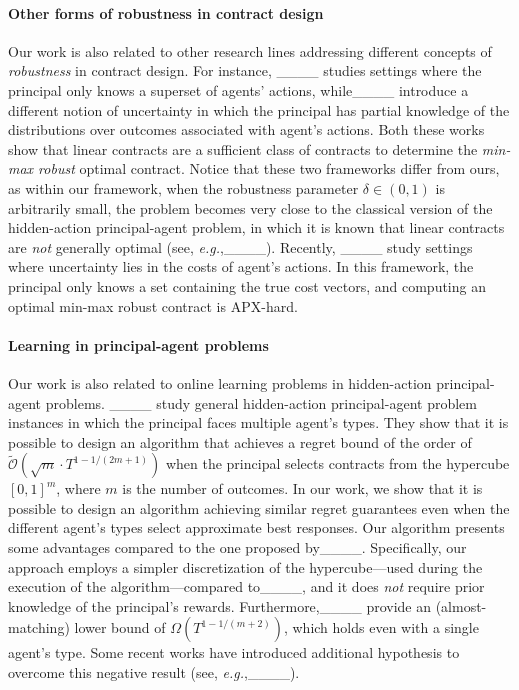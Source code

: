 \paragraph{Other forms of robustness in contract design} 
%
Our work is also related to other research lines addressing different concepts of \emph{robustness} in contract design.
%
%
For instance, ____ studies settings where the principal only knows a superset of agents' actions, while____ introduce a different notion of uncertainty in which the principal has partial knowledge of the distributions over outcomes associated with agent's actions.
%
Both these works show that linear contracts are a sufficient class of contracts to determine the \emph{min-max robust} optimal contract.
%
Notice that these two frameworks differ from ours, as within our framework, when the robustness parameter $\delta \in (0,1)$ is arbitrarily small, the problem becomes very close to the classical version of the hidden-action principal-agent problem, in which it is known that linear contracts are \emph{not} generally optimal (see, \emph{e.g.},____).
%
Recently, ____ study settings where uncertainty lies in the costs of agent's actions.
%
In this framework, the principal only knows a set containing the true cost vectors, and computing an optimal min-max robust contract is \textnormal{APX}-hard.
%
\paragraph{Learning in principal-agent problems} 
%
Our work is also related to online learning problems in hidden-action principal-agent problems.
%
____ study general hidden-action principal-agent problem instances in which the principal faces multiple agent's types.
%
They show that it is possible to design an algorithm that achieves a regret bound of the order of $ \widetilde{\mathcal{O}}(\sqrt{m} \cdot T^{1 - 1/(2m+1)})$ when the principal selects contracts from the hypercube $[0,1]^m$, where $m$ is the number of outcomes.
%
In our work, we show that it is possible to design an algorithm achieving similar regret guarantees even when the different agent's types select approximate best responses.
%
Our algorithm presents some advantages compared to the one proposed by____. 
%
Specifically, our approach employs a simpler discretization of the hypercube---used during the execution of the algorithm---compared to____, and it does \emph{not} require prior knowledge of the principal's rewards.
%
Furthermore,____ provide an (almost-matching) lower bound of $\Omega(T^{1-1/(m+2)})$, which holds even with a single agent's type.
%
Some recent works have introduced additional hypothesis to overcome this negative result (see, \emph{e.g.},____).